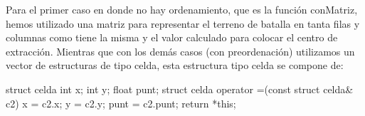 Para el primer caso en donde no hay ordenamiento, que es la función conMatriz, hemos utilizado una matriz para representar el terreno de batalla en tanta filas y columnas como tiene la misma y el valor calculado para colocar el centro de extracción.
Mientras que con los demás casos (con preordenación) utilizamos un vector de estructuras de tipo celda, esta estructura tipo celda se compone de:

struct celda
{
  int x;
  int y;
  float punt;
  struct celda operator =(const struct celda& c2)
  {
    x = c2.x;
    y = c2.y;
    punt = c2.punt;
    return *this;
  }
}
